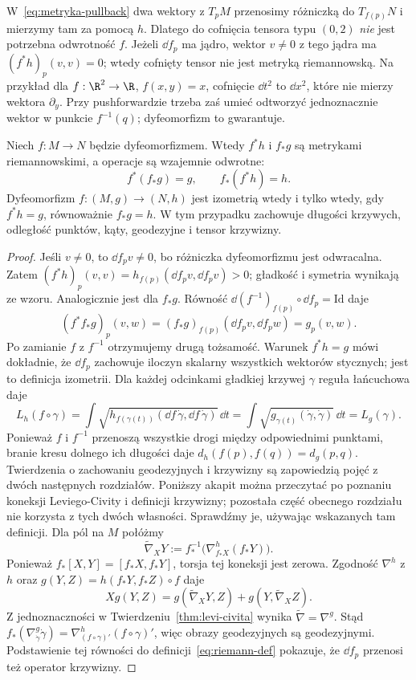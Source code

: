 W~\eqref{eq:metryka-pullback} dwa wektory z $T_pM$
przenosimy różniczką do $T_{f(p)}N$ i mierzymy tam
za pomocą $h$. Dlatego do cofnięcia tensora typu
$(0,2)$ \emph{nie} jest potrzebna odwrotność $f$.
Jeżeli $\dd f_p$ ma jądro, wektor $v\ne0$ z tego
jądra ma $(f^*h)_p(v,v)=0$; wtedy cofnięty tensor
nie jest metryką riemannowską. Na przykład dla
$f:\R^2\to\R$, $f(x,y)=x$, cofnięcie $\dd t^2$
to $\dd x^2$, które nie mierzy wektora $\partial_y$.
Przy pushforwardzie trzeba zaś umieć odtworzyć
jednoznacznie wektor w punkcie $f^{-1}(q)$;
dyfeomorfizm to gwarantuje.

\begin{stwierdzenie}
\label{prop:metryka-dyfeo-izometria}
Niech $f:M\to N$ będzie dyfeomorfizmem.
Wtedy $f^*h$ i $f_*g$ są metrykami riemannowskimi,
a operacje są wzajemnie odwrotne:
\[
 f^*(f_*g)=g,\qquad f_*(f^*h)=h.
\]
Dyfeomorfizm $f:(M,g)\to(N,h)$ jest izometrią
wtedy i tylko wtedy, gdy $f^*h=g$, równoważnie
$f_*g=h$. W tym przypadku zachowuje długości krzywych,
odległość punktów, kąty, geodezyjne i tensor krzywizny.
\end{stwierdzenie}
\begin{proof}
Jeśli $v\ne0$, to $\dd f_pv\ne0$, bo różniczka
dyfeomorfizmu jest odwracalna. Zatem
$(f^*h)_p(v,v)=h_{f(p)}(\dd f_pv,\dd f_pv)>0$;
gładkość i symetria wynikają ze wzoru.
Analogicznie jest dla $f_*g$. Równość
$\dd(f^{-1})_{f(p)}\circ\dd f_p=\mathrm{Id}$ daje
\[
 (f^*f_*g)_p(v,w)
 =(f_*g)_{f(p)}(\dd f_pv,\dd f_pw)
 =g_p(v,w).
\]
Po zamianie $f$ z $f^{-1}$ otrzymujemy drugą
tożsamość. Warunek $f^*h=g$ mówi dokładnie, że
$\dd f_p$ zachowuje iloczyn skalarny wszystkich
wektorów stycznych; jest to definicja izometrii.
Dla każdej odcinkami gładkiej krzywej $\gamma$
reguła łańcuchowa daje
\[
 L_h(f\circ\gamma)
 =\int\sqrt{h_{f(\gamma(t))}
             (\dd f\,\dot\gamma,\dd f\,\dot\gamma)}\,\dd t
 =\int\sqrt{g_{\gamma(t)}
             (\dot\gamma,\dot\gamma)}\,\dd t
 =L_g(\gamma).
\]
Ponieważ $f$ i $f^{-1}$ przenoszą wszystkie drogi
między odpowiednimi punktami, branie kresu dolnego
ich długości daje $d_h(f(p),f(q))=d_g(p,q)$.
Twierdzenia o zachowaniu geodezyjnych i krzywizny są
zapowiedzią pojęć z dwóch następnych rozdziałów.
Poniższy akapit można przeczytać po poznaniu koneksji
Leviego-Civity i definicji krzywizny; pozostała część
obecnego rozdziału nie korzysta z tych dwóch własności.
Sprawdźmy je, używając wskazanych tam definicji. Dla pól na $M$ połóżmy
\[
 \widetilde\nabla_XY
 :=f^{-1}_*\bigl(\nabla^h_{f_*X}(f_*Y)\bigr).
\]
Ponieważ $f_*[X,Y]=[f_*X,f_*Y]$, torsja tej
koneksji jest zerowa. Zgodność $\nabla^h$ z $h$
oraz $g(Y,Z)=h(f_*Y,f_*Z)\circ f$ daje
\[
 Xg(Y,Z)=g(\widetilde\nabla_XY,Z)
             +g(Y,\widetilde\nabla_XZ).
\]
Z jednoznaczności w Twierdzeniu~\ref{thm:levi-civita}
wynika $\widetilde\nabla=\nabla^g$. Stąd
$f_*(\nabla^g_{\dot\gamma}\dot\gamma)
=\nabla^h_{(f\circ\gamma)'}(f\circ\gamma)'$,
więc obrazy geodezyjnych są geodezyjnymi.
Podstawienie tej równości do definicji~\eqref{eq:riemann-def}
pokazuje, że $\dd f_p$ przenosi też operator krzywizny.
\end{proof}

